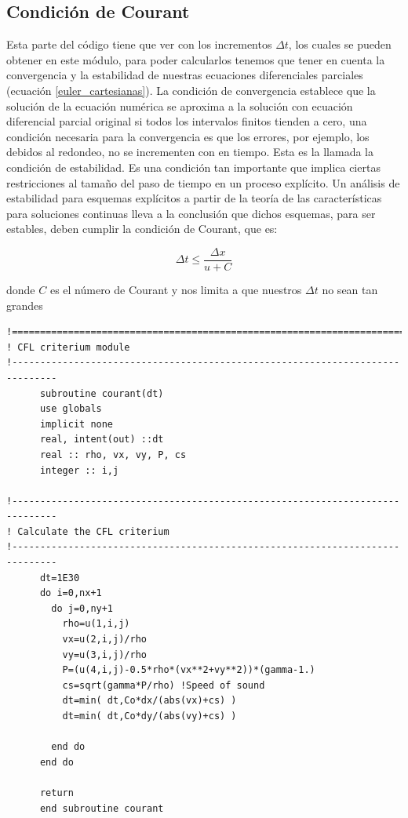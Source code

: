 \documentclass[12pt,a4paper]{book}
\begin{document}
\subsection{Condición de Courant}
Esta parte del código tiene que ver con los incrementos $\Delta t$, los cuales se pueden obtener en este módulo, para poder calcularlos tenemos que tener en cuenta la convergencia 
y la estabilidad de nuestras ecuaciones diferenciales parciales (ecuación \ref{euler_cartesianas}). La condición de convergencia establece que la solución de la ecuación numérica se aproxima a la solución con ecuación 
diferencial 
parcial original si todos los intervalos finitos tienden a cero, una condición necesaria para la convergencia es que los errores, por ejemplo, los debidos al redondeo, no se incrementen con en tiempo. 
Esta es la llamada la condición de estabilidad. Es una condición tan importante que implica ciertas restricciones al tamaño del paso de tiempo en un proceso explícito. Un análisis de estabilidad para esquemas 
explícitos a partir de la teoría de las características para soluciones continuas lleva a la conclusión que dichos esquemas, para ser estables, deben cumplir la condición de Courant, que es: 

\begin{equation}
\Delta t \leq \frac{\Delta x}{u+C}
\end{equation}

\noindent donde $C$ es el número de Courant y nos limita a que nuestros $\Delta t$ no sean tan grandes
\begin{lstlisting}[frame=single]
!==============================================================================
! CFL criterium module
!------------------------------------------------------------------------------
      subroutine courant(dt)
      use globals
      implicit none
      real, intent(out) ::dt
      real :: rho, vx, vy, P, cs
      integer :: i,j

!------------------------------------------------------------------------------
! Calculate the CFL criterium
!------------------------------------------------------------------------------
      dt=1E30
      do i=0,nx+1
        do j=0,ny+1
          rho=u(1,i,j)
          vx=u(2,i,j)/rho
          vy=u(3,i,j)/rho
          P=(u(4,i,j)-0.5*rho*(vx**2+vy**2))*(gamma-1.)
          cs=sqrt(gamma*P/rho) !Speed of sound
          dt=min( dt,Co*dx/(abs(vx)+cs) )
          dt=min( dt,Co*dy/(abs(vy)+cs) )

        end do
      end do

      return
      end subroutine courant

\end{lstlisting}
\end{document}
